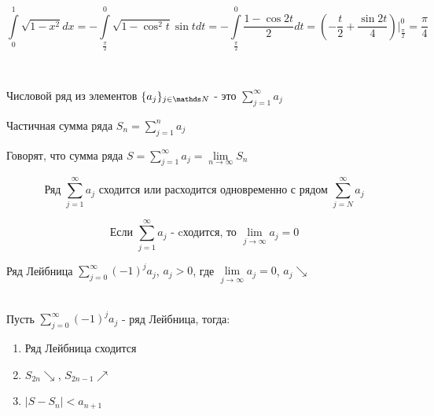 \documentclass[11pt, fleqn]{article}
\begin{document}
\begin{Property}[3]
\begin{Property}[4]
\begin{Property}[2, аддитивность]
\begin{Example}
    \[\int\limits_0^1 \sqrt{1-x^2} dx = - \int\limits_{\frac{\pi}{2}}^0 \sqrt{1-\cos^2 t} \sin t dt = - \int\limits_{\frac{\pi}{2}}^0 \frac{1 - \cos 2t}{2} dt = (-\frac{t}{2} + \frac{\sin 2t}{4}) \Big|_{\frac{\pi}{2}}^0 = \frac{\pi}{4}\]
\end{Example}

\newpage
\begin{Reminder} \
\begin{definition}
    Числовой ряд из элементов $\{a_j\}_{j \in \N}$ - это $\sum\limits_{j=1}^\infty a_j$
\end{definition}

\begin{definition}
    Частичная сумма ряда $S_n = \sum\limits_{j=1}^n a_j$
\end{definition}

\begin{definition}
    Говорят, что сумма ряда $S=\sum\limits_{j=1}^\infty a_j=\lim\limits_{n \rightarrow \infty} S_n$
\end{definition}

\begin{Remark}
    \[\text{Ряд $\sum\limits_{j=1}^\infty a_j$ сходится или расходится одновременно с рядом $\sum\limits_{j=N}^\infty a_j$}\]
\end{Remark}

\begin{Theorem} 
    \[\text{Если $\sum\limits_{j=1}^\infty a_j$ - cходится, то $\lim\limits_{j \rightarrow \infty} a_j = 0$}\]
\end{Theorem}

\begin{definition}
    Ряд Лейбница $\sum\limits_{j=0}^\infty (-1)^j a_j$, $a_j>0$, где $\lim\limits_{j \rightarrow \infty} a_j =0$, $a_j \searrow$
\end{definition}

\begin{theorem}\ \\
    Пусть $\sum\limits_{j=0}^\infty (-1)^j a_j$ - ряд Лейбница, тогда:
    \begin{enumerate}
        \item Ряд Лейбница сходится
        \item $S_{2n} \searrow$, $S_{2n-1} \nearrow$
        \item $|S-S_n|<a_{n+1}$
    \end{enumerate}
\end{theorem}


\end{Reminder}
\end{Property}
\end{Property}
\end{Property}
\end{document}
